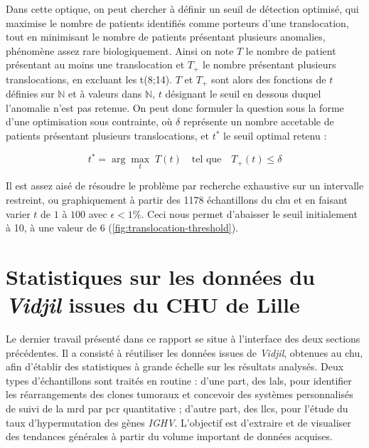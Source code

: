 \vspace{1em}

Dans cette optique, on peut chercher à définir un seuil de détection optimisé, qui maximise le nombre de patients identifiés comme porteurs d'une translocation, 
tout en minimisant le nombre de patients présentant plusieurs anomalies, phénomène assez rare biologiquement. Ainsi on note $T$ le nombre de patient 
présentant au moins une translocation et $T_{+}$ le nombre présentant plusieurs translocations, en excluant les t(8;14). $T$ et $T_{+}$ sont alors des fonctions 
de $t$ définies sur $\mathbb{N}$ et à valeurs dans $\mathbb{N}$, $t$ désignant le seuil en dessous duquel l'anomalie n'est pas retenue. On peut donc formuler la question sous la forme d'une optimisation sous contrainte, 
où $\delta$ représente un nombre accetable de patients présentant plusieurs translocations, et $t^*$ le seuil optimal retenu :

\begin{equation}
    t^* = \arg\max_{t} \; T(t) \quad \text{tel que} \quad T_{+}(t) \leq \delta
 \end{equation}
    
 Il est assez aisé de résoudre le problème par recherche exhaustive sur un intervalle restreint, ou graphiquement à partir des 1178 échantillons du \gls{chu} et en faisant varier 
 $t$ de $1$ à $100$ avec $\epsilon < 1 \%$. Ceci nous permet d'abaisser le seuil initialement à 10, à une valeur de 6 (\autoref{fig:translocation-threshold}).



\section{Statistiques sur les données du \textit{Vidjil} issues du CHU de Lille}

Le dernier travail présenté dans ce rapport se situe à l'interface des deux sections précédentes. Il a consisté à réutiliser les données issues de \textit{Vidjil}, obtenues au \gls{chu}, 
afin d'établir des statistiques à grande échelle sur les résultats analysés. Deux types d'échantillons sont traités en routine : d'une part, des \glspl{lal}, pour identifier les 
réarrangements des clones tumoraux et concevoir des systèmes personnalisés de suivi de la \gls{mrd} par \gls{pcr} quantitative ; d'autre part, des \glspl{llc}, pour l'étude du taux 
d'hypermutation des gènes \textit{IGHV}. L'objectif est d'extraire et de visualiser des tendances générales à partir du volume important de données acquises.

